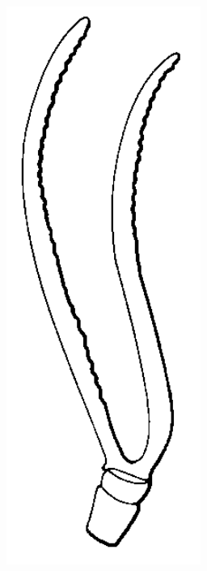 \documentclass[letterpaper, 11pt]{article}
\begin{document}
\begin{figure}[ht!]
\begin{subfigure}[ht!]{0.11\textwidth}
        \includegraphics[width=\textwidth]{ArgidAntenna}

\end{subfigure}
\end{figure}
\end{document}
